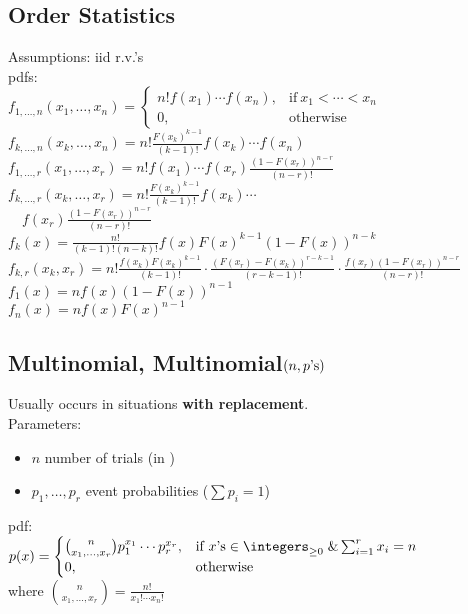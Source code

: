 \subsection*{Order Statistics}
Assumptions: iid r.v.'s\\
pdfs:\\
\(
  f_{1, \dotsc, n}(x_1, \dotsc, x_n) =
    \begin{cases}
      n!f(x_1) \dotsm f(x_n), & \text{if}\ x_1 < \dotsb < x_n\\
      0, & \text{otherwise}
    \end{cases}
\)\\
\(
  f_{k, \dotsc, n}(x_k, \dotsc,x_n) =
    n! \frac{F(x_k)^{k-1}}{(k-1)!} f(x_k) \dotsm f(x_n)
\)\\
\(
  f_{1, \dotsc, r}(x_1, \dotsc, x_r) =
    n! f(x_1) \dotsm f(x_r) \frac{(1-F(x_r))^{n-r}}{(n-r)!}
\)\\
\(
  f_{k, \dotsc, r}(x_k, \dotsc, x_r) =
    n! \frac{F(x_k)^{k-1}}{(k-1)!} f(x_k) \dotsm
\)\\
\(\quad f(x_r) \frac{(1-F(x_r))^{n-r}}{(n-r)!}\)\\
\(
  f_k(x) = \frac{n!}{(k-1)!(n-k)!}f(x)F(x)^{k-1}\left(1-F(x)\right)^{n-k}
\)\\
\(
  f_{k, r}(x_k, x_r) =
    n! \frac{f(x_k)F(x_k)^{k-1}}{(k-1)!} \cdot
    \frac{\left(F(x_r)-F(x_k)\right)^{r-k-1}}{(r-k-1)!} \cdot
    \frac{f(x_r)(1-F(x_r))^{n-r}}{(n-r)!}
\)\\
\(
  f_1(x) = nf(x)\left(1-F(x)\right)^{n-1}
\)\\
\(
  f_n(x) = nf(x)F(x)^{n-1}
\)

\subsection*{Multinomial, \textnormal{Multinomial}\((n, p\textnormal{'s})\)}
Usually occurs in situations \textbf{with replacement}.\\
Parameters:
\begin{itemize}
  \item \(n\) number of trials (in \integers)
  \item \(p_1, \dotsc, p_r\) event probabilities (\(\sum p_i = 1\))
\end{itemize}
pdf:\\
\(
  p(x) =
  \begin{cases}
    \binom{n}{x_1, \dotsc, x_r} p_1^{x_1} \dotsm p_r^{x_r},
    & \text{if } x\text{'s} \in \integers_{\ge 0}\; \& \sum_{i=1}^r x_i = n\\
    0, & \text{otherwise}
  \end{cases}
\)\\
where \(\binom{n}{x_1, \dotsc, x_r} = \frac{n!}{x_1! \dotsm x_n!}\)

